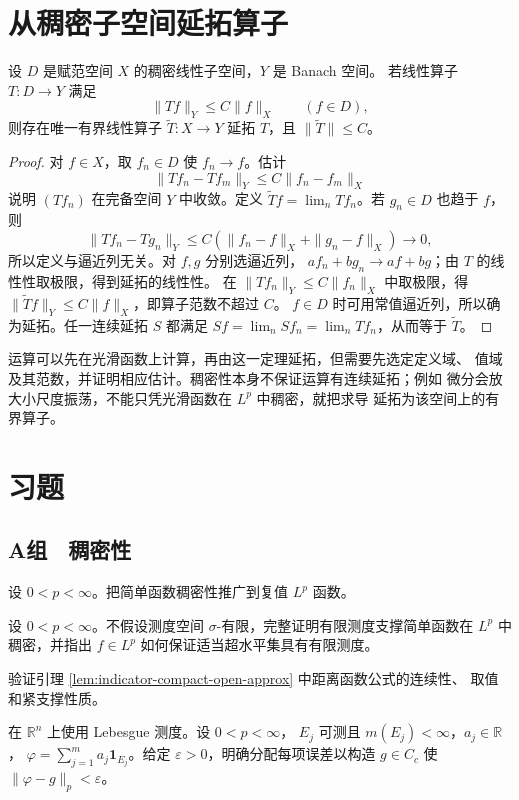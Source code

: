 \section{从稠密子空间延拓算子}

\begin{proposition}[有界算子延拓]
\label{prop:bounded-operator-extension-dense}
设 \(D\) 是赋范空间 \(X\) 的稠密线性子空间，\(Y\) 是 Banach 空间。
若线性算子 \(T:D\to Y\) 满足
\[
 \|Tf\|_Y\le C\|f\|_X\qquad(f\in D),
\]
则存在唯一有界线性算子
\(\widetilde T:X\to Y\) 延拓 \(T\)，且
\(\|\widetilde T\|\le C\)。
\end{proposition}

\begin{proof}
对 \(f\in X\)，取 \(f_n\in D\) 使 \(f_n\to f\)。估计
\[
 \|Tf_n-Tf_m\|_Y\le C\|f_n-f_m\|_X
\]
说明 \((Tf_n)\) 在完备空间 \(Y\) 中收敛。定义
\(\widetilde Tf=\lim_nTf_n\)。若 \(g_n\in D\) 也趋于 \(f\)，则
\[
 \|Tf_n-Tg_n\|_Y\le C(\|f_n-f\|_X+\|g_n-f\|_X)\to0,
\]
所以定义与逼近列无关。对 \(f,g\) 分别选逼近列，
\(af_n+bg_n\to af+bg\)；由 \(T\) 的线性性取极限，得到延拓的线性性。
在 \(\|Tf_n\|_Y\le C\|f_n\|_X\) 中取极限，得
\(\|\widetilde Tf\|_Y\le C\|f\|_X\)，即算子范数不超过 \(C\)。
\(f\in D\) 时可用常值逼近列，所以确为延拓。任一连续延拓 \(S\) 都满足
\(Sf=\lim_nSf_n=\lim_nTf_n\)，从而等于 \(\widetilde T\)。
\end{proof}

运算可以先在光滑函数上计算，再由这一定理延拓，但需要先选定定义域、
值域及其范数，并证明相应估计。稠密性本身不保证运算有连续延拓；例如
微分会放大小尺度振荡，不能只凭光滑函数在 \(L^p\) 中稠密，就把求导
延拓为该空间上的有界算子。

\section*{习题}
\subsection*{A组　稠密性}
\begin{enumerate}[label=\textbf{\thechapter.\arabic*.}]
设 \(0<p<\infty\)。把简单函数稠密性推广到复值 \(L^p\) 函数。

设 \(0<p<\infty\)。不假设测度空间 \(\sigma\)-有限，完整证明有限测度支撑简单函数在
\(L^p\) 中稠密，并指出 \(f\in L^p\) 如何保证适当超水平集具有有限测度。

验证引理 \ref{lem:indicator-compact-open-approx} 中距离函数公式的连续性、
取值和紧支撑性质。

在 \(\mathbb R^n\) 上使用 Lebesgue 测度。设 \(0<p<\infty\)，
\(E_j\) 可测且 \(m(E_j)<\infty\)，\(a_j\in\mathbb R\)，
\(\varphi=\sum_{j=1}^ma_j\mathbf1_{E_j}\)。给定
\(\varepsilon>0\)，明确分配每项误差以构造
\(g\in C_c\) 使 \(\|\varphi-g\|_p<\varepsilon\)。

\end{enumerate}
